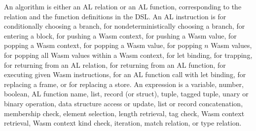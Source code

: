 An algorithm is either an AL relation or an AL function, corresponding to the
relation and the function definitions in the DSL.
An AL instruction is \ifi{} for conditionally choosing a branch, \eitheri{} for
nondeterministically choosing a branch, \enteri{} for entering a block,
\pushctxi{} for pushing a Wasm context, \pushi{} for pushing a Wasm value,
\popctxi{} for popping a Wasm context, \popi{} for popping a Wasm value,
\popni{} for popping $n$ Wasm values, \popalli{} for popping all Wasm values
within a Wasm context,  for let binding, \trapi{} for trapping,
\returnreli{} for returning from an AL relation, \returnfuni{} for returning
from an AL function, \executei{} for executing given Wasm instructions,
\calli{} for an AL function call with let binding, \replaceframei{} for
replacing a frame, or \replacestorei{} for replacing a store.
An expression is a variable, number, boolean, AL function name, list, record
(or struct), tuple, tagged tuple, unary or binary operation, data structure
access or update, list or record concatenation, membership check, element
selection, length retrieval, tag check, Wasm context retrieval, Wasm context
kind check, iteration, match relation, or type relation.


